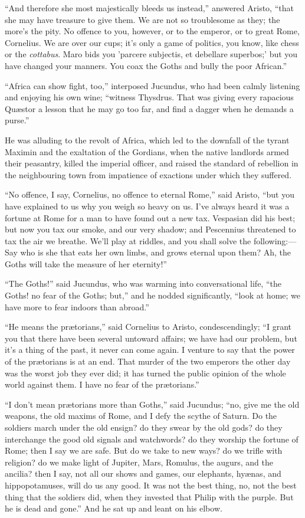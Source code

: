 ``And therefore she most majestically bleeds us instead,''
answered Aristo, ``that she may have treasure to give them. We are
not so troublesome as they; the more's the pity. No offence to you,
however, or to the emperor, or to great Rome, Cornelius. We are over
our cups; it's only a game of politics, you know, like chess or the \emph{cottabus}.
Maro bids you 'parcere subjectis, et debellare superbos;' but you have
changed your manners. You coax the Goths and bully the poor
African.''

``Africa can show fight, too,'' interposed Jucundus, who
had been calmly listening and enjoying his own wine; ``witness
Thysdrus. That was giving every rapacious Quæstor a lesson that
he may go too far, and find a dagger when he demands a purse.''

He was alluding to the revolt of Africa, which led to the downfall
of the tyrant Maximin and the exaltation of the Gordians, when the
native landlords armed their peasantry, killed the imperial officer,
and raised the standard of rebellion in the neighbouring town from
impatience of exactions under which they suffered.

``No offence, I say, Cornelius, no offence to eternal
Rome,'' said Aristo, ``but you have explained to us why you
weigh so heavy on us. I've always heard it was a fortune at Rome for a
man to have found out a new tax. Vespasian did his best; but now you
tax our smoke, and our very shadow; and Pescennius threatened to tax
the air we breathe. We'll play at riddles, and you shall solve the
following:—Say who is she that eats her own limbs, and grows eternal
upon them? Ah, the Goths will take the measure of her eternity!''

``The Goths!'' said Jucundus, who was warming into
conversational life, ``the Goths! no fear of the Goths; but,''
and he nodded significantly, ``look at home; we have more to fear
indoors than abroad.''

``He means the prætorians,'' said Cornelius to Aristo,
condescendingly; ``I grant you that there have been several
untoward affairs; we have had our problem, but it's a thing of the
past, it never can come again. I venture to say that the power of the
prætorians is at an end. That murder of the two emperors the
other day was the worst job they ever did; it has turned the public
opinion of the whole world against them. I have no fear of the
prætorians.''

``I don't mean prætorians more than Goths,'' said Jucundus;
``no, give me the old weapons, the old maxims of Rome, and I defy
the scythe of Saturn. Do the soldiers march under the old ensign? do
they swear by the old gods? do they interchange the good old signals
and watchwords? do they worship the fortune of Rome; then I say we are
safe. But do we take to new ways? do we trifle with religion? do we
make light of Jupiter, Mars, Romulus, the augurs, and the ancilia?
then I say, not all our shows and games, our elephants, hyænas, and
hippopotamuses, will do us any good. It was not the best thing, no,
not the best thing that the soldiers did, when they invested that
Philip with the purple. But he is dead and gone.'' And he sat up
and leant on his elbow.

